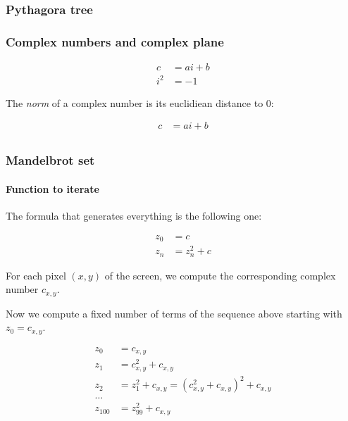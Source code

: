 \documentclass[10pt]{beamer}
\begin{document}
\begin{frame}
  \frametitle{Pythagora tree}

\end{frame}

\begin{frame}
  \frametitle{Complex numbers and complex plane}

  \begin{align*}
    c &= ai + b\\
    i^{2} &= -1
  \end{align*}

  The \emph{norm} of a complex number is its euclidiean distance to 0:

  \begin{align*}
    c &= ai + b \\
  \end{align*}

\end{frame}

\begin{frame}
  \frametitle{Mandelbrot set}

  \framesubtitle{Function to iterate}

  The formula that generates everything is the following one:

  \begin{align*}
    z_{0} &= c \\
    z_{n} &= z_{n}^{2} + c
  \end{align*}

  For each pixel $(x, y)$ of the screen, we compute the corresponding
  complex number $c_{x,y}$.

  \medskip

  Now we compute a fixed number of terms of the sequence above
  starting with $z_{0} = c_{x,y}$.

  \begin{align*}
    z_{0} &= c_{x, y} \\
    z_{1} &= c_{x, y}^{2} + c_{x, y} \\
    z_{2} &= z_{1}^{2} + c_{x, y} = (c_{x, y}^{2} + c_{x, y})^{2} + c_{x, y} \\
    \dots \\
    z_{100} &= z_{99}^{2} + c_{x, y}
  \end{align*}

\end{frame}
\end{document}
